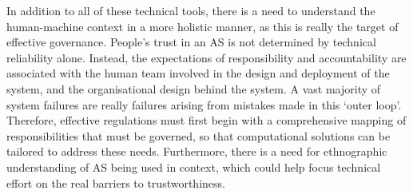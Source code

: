 \documentclass[sigconf,nonacm]{acmart}%
\begin{document}
	In addition to all of these technical tools, there is a need to understand the human-machine context in a more holistic manner, as this is really the target of effective governance. People's trust in an AS is not determined by technical reliability alone. Instead, the expectations of responsibility and accountability are associated with the human team involved in the design and deployment of the system, and the organisational design behind the system. A vast majority of system failures are really failures arising from mistakes made in this `outer loop'. Therefore, effective regulations must first begin with a comprehensive mapping of responsibilities that must be governed, so that computational solutions can be tailored to address these needs. Furthermore, there is a need for ethnographic understanding of AS being used in context, which could help focus technical effort on the real barriers to trustworthiness.
	
\end{document}
